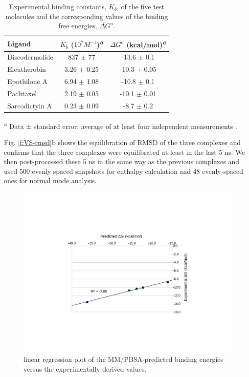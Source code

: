 \documentclass[11pt]{report}
\begin{document}
\begin{table}[h]
  \centering
  \caption[Experimental binding constants]{Experimental binding constants, $K_{b}$, of the five test molecules and the 
  corresponding values of the binding free energies, $\Delta{G}^{o}$.}
  \label{t:VS-deltaG}
  \begin{tabular*}{\linewidth}{@{\extracolsep{\fill}}lcc}
   \toprule
   Ligand & $K_{b}$ ($10^{7} M^{-1}$)\textsuperscript{\emph{a}} & $\Delta{G}^{o}$ (kcal/mol)\textsuperscript{\emph{a}} \\
   \midrule
   Discodermolide & 837 $\pm$ 77 & -13.6 $\pm$ 0.1 \\
   Eleutherobin & 3.26 $\pm$ 0.25 & -10.3 $\pm$ 0.05 \\
   Epothilone A & 6.94 $\pm$ 1.08 & -10.8 $\pm$ 0.1 \\
   Paclitaxel & 2.19 $\pm$ 0.05 & -10.1 $\pm$ 0.01 \\
   Sarcodictyin A & 0.23 $\pm$ 0.09 & -8.7 $\pm$ 0.2 \\
   \bottomrule
  \end{tabular*}
  \vspace{-0.45cm}
     \begin{flushleft}
  \textsuperscript{\emph{a}} Data $\pm$ standard error; average of at least four 
   independent measurements \cite{Buey2004,Buey2005}.
   \end{flushleft}
\end{table}
Fig. \ref{f:VS-rmsd}b 
shows the equilibration of RMSD of the three complexes and confirms that the three complexes were equilibrated at least in the last 5 ns. We then post-processed these 5 ns in the same way as the previous complexes and used 500 evenly spaced snapshots for enthalpy calculation and 48 evenly-spaced ones for normal mode analysis.
\begin{figure}
\centering
\includegraphics[trim=6cm 5cm 5cm 5cm, clip=true, width=0.7\linewidth]{images/Regression_plot}
\caption[Linear regression plot]{linear regression plot of the MM/PBSA-predicted binding energies versus the experimentally derived values.}
\label{f:VS-regression}
\end{figure}
\end{document}
